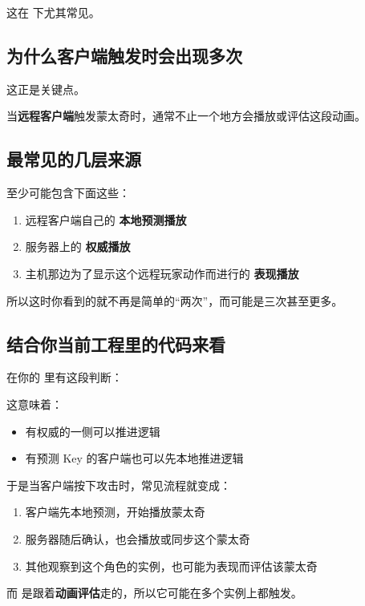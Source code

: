 这在  下尤其常见。

\subsection{为什么客户端触发时会出现多次}

这正是关键点。

当\textbf{远程客户端}触发蒙太奇时，通常不止一个地方会播放或评估这段动画。

\subsection{最常见的几层来源}

至少可能包含下面这些：

\begin{enumerate}
	\item 远程客户端自己的 \textbf{本地预测播放}
	\item 服务器上的 \textbf{权威播放}
	\item {} 主机那边为了显示这个远程玩家动作而进行的 \textbf{表现播放}
\end{enumerate}

所以这时你看到的就不再是简单的“两次”，而可能是三次甚至更多。

\subsection{结合你当前工程里的代码来看}

在你的  里有这段判断：


这意味着：

\begin{itemize}
	\item 有权威的一侧可以推进逻辑
	\item 有预测 Key 的客户端也可以先本地推进逻辑
\end{itemize}

于是当客户端按下攻击时，常见流程就变成：

\begin{enumerate}
	\item 客户端先本地预测，开始播放蒙太奇
	\item 服务器随后确认，也会播放或同步这个蒙太奇
	\item 其他观察到这个角色的实例，也可能为表现而评估该蒙太奇
\end{enumerate}

而  是跟着\textbf{动画评估}走的，所以它可能在多个实例上都触发。

